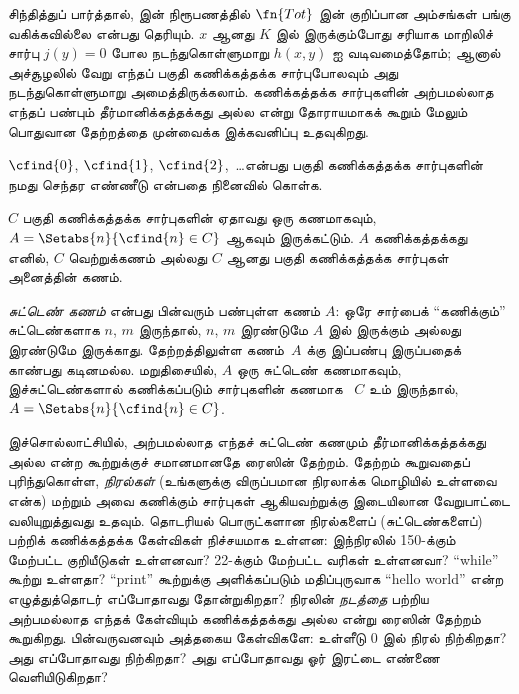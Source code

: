 \documentclass[../../../include/open-logic-section]{subfiles}
\begin{document}


சிந்தித்துப் பார்த்தால்,  இன் நிரூபணத்தில்
$\fn{Tot}$ இன் குறிப்பான அம்சங்கள் பங்கு வகிக்கவில்லை என்பது தெரியும்.
$x$ ஆனது $K$ இல் இருக்கும்போது சரியாக மாறிலிச் சார்பு $j(y) = 0$
போல நடந்துகொள்ளுமாறு $h(x,y)$ ஐ வடிவமைத்தோம்; ஆனால் அச்சூழலில்
வேறு எந்தப் பகுதி கணிக்கத்தக்க சார்புபோலவும் அது நடந்துகொள்ளுமாறு
அமைத்திருக்கலாம். கணிக்கத்தக்க சார்புகளின் அற்பமல்லாத எந்தப்
பண்பும் தீர்மானிக்கத்தக்கது அல்ல என்று தோராயமாகக் கூறும் மேலும்
பொதுவான தேற்றத்தை முன்வைக்க இக்கவனிப்பு உதவுகிறது.

$\cfind{0}$, $\cfind{1}$, $\cfind{2}$,~\dots என்பது பகுதி
கணிக்கத்தக்க சார்புகளின் நமது செந்தர எண்ணீடு என்பதை நினைவில் கொள்க.

\begin{thm}[ரைஸின் தேற்றம்]
  $C$ பகுதி கணிக்கத்தக்க சார்புகளின் ஏதாவது ஒரு கணமாகவும்,
  $A = \Setabs{n}{\cfind{n} \in C}$ ஆகவும் இருக்கட்டும்.
  $A$ கணிக்கத்தக்கது எனில், $C$ வெற்றுக்கணம் அல்லது $C$ ஆனது பகுதி
  கணிக்கத்தக்க சார்புகள் அனைத்தின் கணம்.
\end{thm}

{\em சுட்டெண் கணம்} என்பது பின்வரும் பண்புள்ள கணம் $A$: ஒரே சார்பைக்
``கணிக்கும்'' சுட்டெண்களாக $n$, $m$ இருந்தால், $n$, $m$ இரண்டுமே
$A$ இல் இருக்கும் அல்லது இரண்டுமே இருக்காது. தேற்றத்திலுள்ள கணம்~$A$
க்கு இப்பண்பு இருப்பதைக் காண்பது கடினமல்ல. மறுதிசையில், $A$ ஒரு
சுட்டெண் கணமாகவும், இச்சுட்டெண்களால் கணிக்கப்படும் சார்புகளின் கணமாக
~$C$ உம் இருந்தால், $A = \Setabs{n}{\cfind{n} \in C}$.

\begin{explain}
இச்சொல்லாட்சியில், அற்பமல்லாத எந்தச் சுட்டெண் கணமும்
தீர்மானிக்கத்தக்கது அல்ல என்ற கூற்றுக்குச் சமானமானதே ரைஸின் தேற்றம்.
தேற்றம் கூறுவதைப் புரிந்துகொள்ள, \emph{நிரல்கள்} (உங்களுக்கு விருப்பமான
நிரலாக்க மொழியில் உள்ளவை என்க) மற்றும் அவை கணிக்கும் சார்புகள்
ஆகியவற்றுக்கு இடையிலான வேறுபாட்டை வலியுறுத்துவது உதவும்.
தொடரியல் பொருட்களான நிரல்களைப் (சுட்டெண்களைப்) பற்றிக் கணிக்கத்தக்க
கேள்விகள் நிச்சயமாக உள்ளன: இந்நிரலில் 150-க்கும் மேற்பட்ட குறியீடுகள்
உள்ளனவா? 22-க்கும் மேற்பட்ட வரிகள் உள்ளனவா? ``while'' கூற்று
உள்ளதா? ``print'' கூற்றுக்கு அளிக்கப்படும் மதிப்புருவாக
``hello world'' என்ற எழுத்துத்தொடர் எப்போதாவது தோன்றுகிறதா?
நிரலின் \emph{நடத்தை} பற்றிய அற்பமல்லாத எந்தக் கேள்வியும்
கணிக்கத்தக்கது அல்ல என்று ரைஸின் தேற்றம் கூறுகிறது. பின்வருவனவும்
அத்தகைய கேள்விகளே: உள்ளீடு $0$ இல் நிரல் நிற்கிறதா? அது
எப்போதாவது நிற்கிறதா? அது எப்போதாவது ஓர் இரட்டை எண்ணை வெளியிடுகிறதா?
\end{explain}
\end{document}
